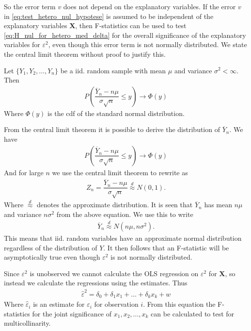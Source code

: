So the error term $v$ does not depend on the explanatory variables. If the error $v$ in \eqref{eq:test_hetero_nul_hypotese} is assumed to be independent of the explanatory variables $\mathbf{X}$, then F-statistics can be used to test \eqref{eq:H_nul_for_hetero_med_delta} for the overall significance of the explanatory variables for $\varepsilon^2$, even though this error term is not normally distributed. We state the central limit theorem without proof to justify this. 
\begin{theorem} \label{th:Central_limit_theorem}
Let $\{ Y_1, Y_2, \ldots, Y_n \}$ be a iid. random sample with mean $\mu$ and variance $\sigma^2 < \infty$. Then
\begin{align*}
    P\left(\dfrac{\overline{Y}_n - n\mu}{\sigma \sqrt{n}}\leq y\right) \rightarrow \Phi(y)
\end{align*}
Where $\Phi(y)$ is the cdf of the standard normal distribution. 
\end{theorem}
From the central limit theorem it is possible to derive the distribution of $\overline{Y}_n$. We have  
\begin{align*}
    P\left(\dfrac{\overline{Y}_n - n\mu}{\sigma \sqrt{n}} \leq y\right) \rightarrow \Phi(y)
\end{align*}
And for large $n$ we use the central limit theorem to rewrite as
\begin{align*}
    Z_n = \dfrac{\overline{Y}_n - n\mu}{\sigma \sqrt{n}} \stackrel{d}{\approx} N(0,1). 
\end{align*}
Where $\stackrel{d}{\approx}$ denotes the approximate distribution. It is seen that $\overline{Y}_n$ has mean $n\mu$ and variance $n \sigma^2$ from the above equation. We use this to write
\begin{align*}
    \overline{Y}_n \stackrel{d}{\approx} N(n\mu, n\sigma^2). 
\end{align*}
This means that iid. random variables have an approximate normal distribution regardless of the distribution of $Y$. It then follows that an F-statistic will be asymptotically true even though $\varepsilon^2$ is not normally distributed. 

Since $\varepsilon^2$ is unobserved we cannot calculate the OLS regression on $\varepsilon^2$ for $\mathbf{X}$, so instead we calculate the regressions using the estimates. Thus
\begin{align}\label{eq:OLS_residual_hat_epsioln_i_anden}
    \hat{\varepsilon}^2 = \delta_0 + \delta_1x_1 + \ldots + \delta_kx_k + w
\end{align}
Where $\hat{\varepsilon}_i$ is an estimate for $\varepsilon_i$ for observation $i$. From this equation the F-statistics for the joint significance of $x_1, x_2, \ldots, x_k$ can be calculated to test for multicollinarity. 

